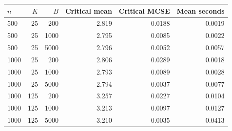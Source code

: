 \begin{tabular}{lrrrrr}
\toprule
$n$ & $K$ & $B$ & Critical mean & Critical MCSE & Mean seconds \\
\midrule
500 & 25 & 200 & 2.819 & 0.0188 & 0.0019 \\
500 & 25 & 1000 & 2.795 & 0.0085 & 0.0022 \\
500 & 25 & 5000 & 2.796 & 0.0052 & 0.0057 \\
1000 & 25 & 200 & 2.806 & 0.0289 & 0.0018 \\
1000 & 25 & 1000 & 2.793 & 0.0089 & 0.0028 \\
1000 & 25 & 5000 & 2.794 & 0.0037 & 0.0077 \\
1000 & 125 & 200 & 3.257 & 0.0227 & 0.0104 \\
1000 & 125 & 1000 & 3.213 & 0.0097 & 0.0127 \\
1000 & 125 & 5000 & 3.210 & 0.0035 & 0.0413 \\
\bottomrule
\end{tabular}

